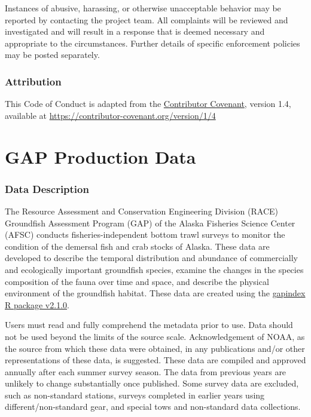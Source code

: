\documentclass[
  letterpaper,
  oneside,
  open=any]{scrbook}
\begin{document}
Instances of abusive, harassing, or otherwise unacceptable behavior may
be reported by contacting the project team. All complaints will be
reviewed and investigated and will result in a response that is deemed
necessary and appropriate to the circumstances. Further details of
specific enforcement policies may be posted separately.

\hypertarget{attribution}{%
\section{Attribution}\label{attribution}}

This Code of Conduct is adapted from the
\href{https://contributor-covenant.org}{Contributor Covenant}, version
1.4, available at
\href{https://contributor-covenant.org/version/1/4/}{https://contributor-covenant.org/version/1/4}

\part{GAP Production Data}

\hypertarget{data-description}{%
\section*{Data Description}\label{data-description}}


The Resource Assessment and Conservation Engineering Division (RACE)
Groundfish Assessment Program (GAP) of the Alaska Fisheries Science
Center (AFSC) conducts fisheries-independent bottom trawl surveys to
monitor the condition of the demersal fish and crab stocks of Alaska.
These data are developed to describe the temporal distribution and
abundance of commercially and ecologically important groundfish species,
examine the changes in the species composition of the fauna over time
and space, and describe the physical environment of the groundfish
habitat. These data are created using the
\href{https://afsc-gap-products.github.io/gapindex/index.html}{gapindex
R package v2.1.0}.

Users must read and fully comprehend the metadata prior to use. Data
should not be used beyond the limits of the source scale.
Acknowledgement of NOAA, as the source from which these data were
obtained, in any publications and/or other representations of these
data, is suggested. These data are compiled and approved annually after
each summer survey season. The data from previous years are unlikely to
change substantially once published. Some survey data are excluded, such
as non-standard stations, surveys completed in earlier years using
different/non-standard gear, and special tows and non-standard data
collections.
\end{document}
